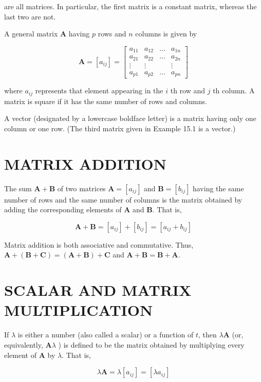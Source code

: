 \documentclass[10pt]{article}
\begin{document}
are all matrices. In particular, the first matrix is a constant matrix, whereas the last two are not.

A general matrix $\mathbf{A}$ having $p$ rows and $n$ columns is given by

$$
\mathbf{A}=\left[a_{i j}\right]=\left[\begin{array}{cccc}
a_{11} & a_{12} & \ldots & a_{1 n} \\
a_{21} & a_{22} & \ldots & a_{2 n} \\
\vdots & \vdots & & \vdots \\
a_{p 1} & a_{p 2} & \ldots & a_{p n}
\end{array}\right]
$$

where $a_{i j}$ represents that element appearing in the $i$ th row and $j$ th column. A matrix is square if it has the same number of rows and columns.

A vector (designated by a lowercase boldface letter) is a matrix having only one column or one row. (The third matrix given in Example 15.1 is a vector.)

\section*{MATRIX ADDITION}
The sum $\mathbf{A}+\mathbf{B}$ of two matrices $\mathbf{A}=\left[a_{i j}\right]$ and $\mathbf{B}=\left[b_{i j}\right]$ having the same number of rows and the same number of columns is the matrix obtained by adding the corresponding elements of $\mathbf{A}$ and $\mathbf{B}$. That is,

$$
\mathbf{A}+\mathbf{B}=\left[a_{i j}\right]+\left[b_{i j}\right]=\left[a_{i j}+b_{i j}\right]
$$

Matrix addition is both associative and commutative. Thus, $\mathbf{A}+(\mathbf{B}+\mathbf{C})=(\mathbf{A}+\mathbf{B})+\mathbf{C}$ and $\mathbf{A}+\mathbf{B}=\mathbf{B}+\mathbf{A}$.

\section*{SCALAR AND MATRIX MULTIPLICATION}
If $\lambda$ is either a number (also called a scalar) or a function of $t$, then $\lambda \mathbf{A}$ (or, equivalently, $\mathbf{A} \lambda$ ) is defined to be the matrix obtained by multiplying every element of $\mathbf{A}$ by $\lambda$. That is,

$$
\lambda \mathbf{A}=\lambda\left[a_{i j}\right]=\left[\lambda a_{i j}\right]
$$
\end{document}
